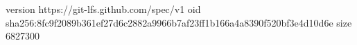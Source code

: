 version https://git-lfs.github.com/spec/v1
oid sha256:8fc9f2089b361ef27d6c2882a9966b7af23ff1b166a4a8390f520bf3e4d10d6e
size 6827300
